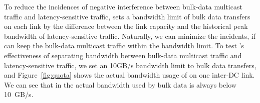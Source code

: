 To reduce the incidences of negative interference between bulk-data 
multicast traffic and latency-sensitive traffic, \company sets a 
bandwidth limit of bulk data transfers on each link by the difference
between the link capacity and the historical peak bandwidth of 
latency-sensitive traffic. Naturally, we can minimize the incidents, 
if \name can keep the bulk-data multicast traffic within the bandwidth 
limit. To test \name's effectiveness of separating bandwidth between 
bulk-data multicast traffic and latency-sensitive traffic, we set an
10GB/s bandwidth limit to bulk data transfers, and 
Figure~\ref{fig:quota} shows the actual bandwidth usage of \name on 
one inter-DC link. We can see that in \name the actual bandwidth used
by bulk data is always below 10~GB/s. 

\begin{table}[t]
\begin{center}
\end{center}
\label{table:usage}
\vspace{-0.4cm}
\end{table}

